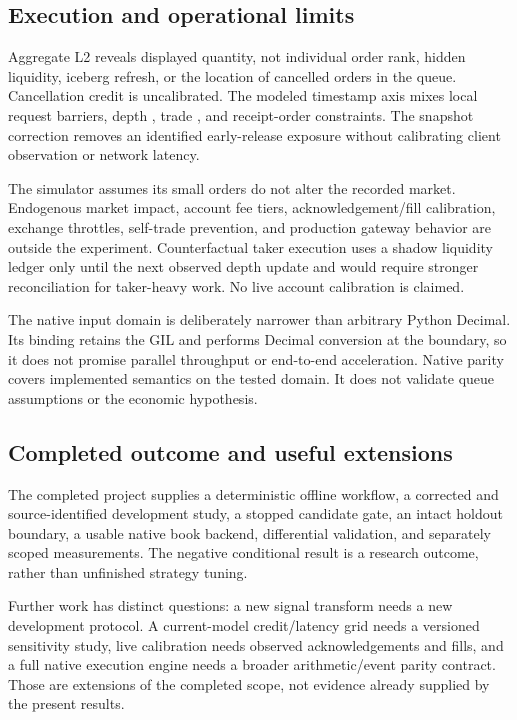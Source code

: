\subsection{Execution and operational limits}

Aggregate L2 reveals displayed quantity, not individual order rank, hidden
liquidity, iceberg refresh, or the location of cancelled orders in the queue.
Cancellation credit is uncalibrated. The modeled timestamp axis mixes local
request barriers, depth , trade , and receipt-order constraints.
The snapshot correction removes an identified early-release exposure without
calibrating client observation or network latency.

The simulator assumes its small orders do not alter the recorded market.
Endogenous market impact, account fee tiers, acknowledgement/fill calibration,
exchange throttles, self-trade prevention, and production gateway behavior are
outside the experiment. Counterfactual taker execution uses a shadow
liquidity ledger only until the next observed depth update and would require
stronger reconciliation for taker-heavy work. No live account calibration is
claimed.

The native input domain is deliberately narrower than arbitrary Python
Decimal. Its binding retains the GIL and performs Decimal conversion at the
boundary, so it does not promise parallel throughput or end-to-end
acceleration. Native parity covers implemented semantics on the tested domain.
It does not validate queue assumptions or the economic hypothesis.

\subsection{Completed outcome and useful extensions}

The completed project supplies a deterministic offline workflow, a corrected
and source-identified development study, a stopped candidate gate, an intact
holdout boundary, a usable native book backend, differential validation, and
separately scoped measurements. The negative conditional result is a research
outcome, rather than unfinished strategy tuning.

Further work has distinct questions: a new signal transform needs a new
development protocol. A current-model credit/latency grid needs a versioned
sensitivity study, live calibration needs observed acknowledgements and
fills, and a full native execution engine needs a broader arithmetic/event
parity contract. Those are extensions of the completed scope, not evidence
already supplied by the present results.
